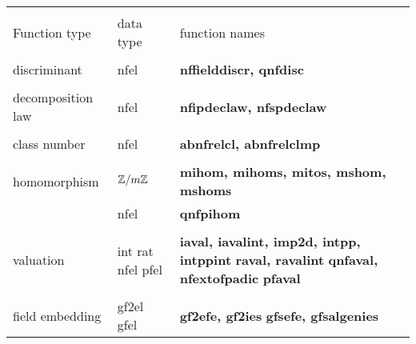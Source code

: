 \begin{center}
\begin{tabular}{|p{1.1in}|p{0.7in}|p{3.5in}|}
\hline &&\\[-1.3ex]
Function type  &
data \newline
type &
function names\\[1.5ex]
\hline &&\\[-1.3ex]

discriminant &
nfel &
{\bf nffielddiscr, qnfdisc}\\[1.5ex]
\hline &&\\[-1.3ex]

decomposition \newline
law &
nfel &
{\bf nfipdeclaw, nfspdeclaw}\\[1.5ex]
\hline &&\\[-1.3ex]

class number &
nfel &
{\bf abnfrelcl, abnfrelclmp}\\[1.5ex]
\hline &&\\[-1.3ex]

homomorphism &
$\mbox{$\mathbb Z$}/m\mbox{$\mathbb Z$}$ &
{\bf mihom, mihoms, mitos, mshom,\newline
mshoms} \\
& nfel &
{\bf qnfpihom}\\[1.5ex]
\hline &&\\[-1.3ex]

valuation &
int \newline
rat \newline
nfel \newline
pfel &
{\bf iaval, iavalint, imp2d, intpp, intppint} \newline
{\bf raval, ravalint} \newline
{\bf qnfaval, nfextofpadic} \newline
{\bf pfaval}\\[1.5ex]
\hline &&\\[-1.3ex]

field \newline
embedding &
gf2el \newline
gfel &
{\bf gf2efe, gf2ies} \newline
{\bf gfsefe, gfsalgenies}\\[1.5ex]
\hline
\end{tabular}
\end{center}

